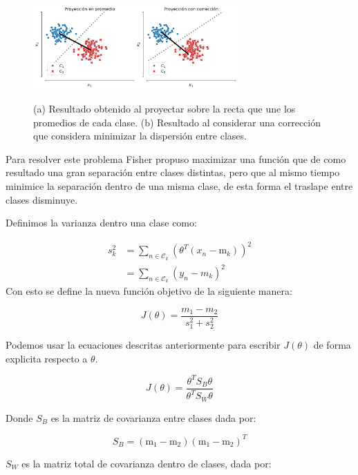 \begin{figure}[H]
	\centering
	\includegraphics[width=0.7\textwidth]{img/cap2_dos_clases_proyeccion.pdf}\\
	\caption{(a) Resultado obtenido al proyectar sobre la recta que une los promedios de cada clase. (b) Resultado al considerar una corrección que considera minimizar la dispersión entre clases.}
	\label{fig:ej_fda}
\end{figure}

Para resolver este problema Fisher propuso maximizar una función que de como resultado una gran separación entre clases distintas, pero que al mismo tiempo minimice la separación dentro de una misma clase, de esta forma el traslape entre clases disminuye. 

Definimos la varianza dentro una clase como:

\begin{align}
	s_k^2 &= \sum_{n\in \mathcal{C}_k}(\theta^T(x_n-\text{m}_k))^2\\
	&= \sum_{n\in \mathcal{C}_k}(y_n-m_k)^2
\end{align}
Con esto se define la nueva función objetivo de la siguiente manera:

\begin{equation}
J(\theta) = \frac{m_1-m_2}{s_1^2+s_2 ^2}
\end{equation}

Podemos usar la ecuaciones descritas anteriormente para escribir $J(\theta)$ de forma explicita respecto a $\theta$.

\begin{equation}
	J(\theta) = \frac{\theta^TS_B\theta}{\theta^TS_W\theta}
\end{equation}

Donde $S_B$ es la matriz de covarianza entre clases dada por:

\begin{equation}
	S_B = (\text{m}_1-\text{m}_2)(\text{m}_1-\text{m}_2)^T
\end{equation}

$S_W$ es la matriz total de covarianza dentro de clases, dada por:

